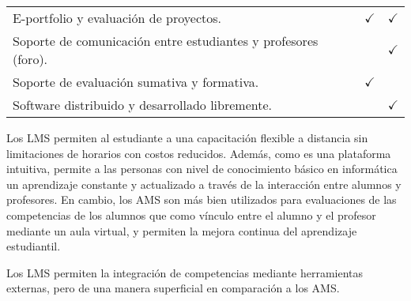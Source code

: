 \begin{table}[H]
{\begin{tabular}{lllcc}
		\multicolumn{3}{l}{E-portfolio y evaluación de proyectos.}                                              & $\checkmark$         & $\checkmark$         \\
		\multicolumn{3}{l}{Soporte de comunicación entre estudiantes y profesores (foro).}                      &           & $\checkmark$         \\
		\multicolumn{3}{l}{Soporte de evaluación sumativa y formativa.}                                         & $\checkmark$         &           \\
		\multicolumn{3}{l}{Software distribuido y desarrollado libremente.}                                     &           & $\checkmark$         \\
		\bottomrule
	\end{tabular}
	}
\end{table}

Los LMS permiten al estudiante a una capacitación flexible a distancia sin limitaciones de horarios con costos reducidos. Además, como es una plataforma intuitiva, permite a las personas con nivel de conocimiento básico en informática un aprendizaje constante y actualizado a través de la interacción entre alumnos y profesores. En cambio, los AMS son más bien utilizados para evaluaciones de las competencias de los alumnos que como vínculo entre el alumno y el profesor mediante un aula virtual, y permiten la mejora continua del aprendizaje estudiantil.

Los LMS permiten la integración de competencias mediante herramientas externas, pero de una manera superficial en comparación a los AMS.